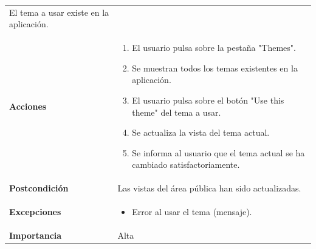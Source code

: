 \documentclass[
]{article}
\providecommand{\tightlist}{%
  \setlength{\itemsep}{0pt}\setlength{\parskip}{0pt}}
\begin{document}
\begin{longtable}[]{@{}ll@{}}
\begin{minipage}[t]{0.71\columnwidth}
El tema a usar existe en la aplicación.\strut
\end{minipage}\tabularnewline
\begin{minipage}[t]{0.23\columnwidth}\raggedright
\textbf{Acciones}\strut
\end{minipage} & \begin{minipage}[t]{0.71\columnwidth}\raggedright
\begin{enumerate}
\def\labelenumi{\arabic{enumi}.}
\tightlist
\item
  El usuario pulsa sobre la pestaña "Themes".
\item
  Se muestran todos los temas existentes en la aplicación.
\item
  El usuario pulsa sobre el botón "Use this theme" del tema a usar.
\item
  Se actualiza la vista del tema actual.
\item
  Se informa al usuario que el tema actual se ha cambiado
  satisfactoriamente.
\end{enumerate}\strut
\end{minipage}\tabularnewline
\begin{minipage}[t]{0.23\columnwidth}\raggedright
\textbf{Postcondición}\strut
\end{minipage} & \begin{minipage}[t]{0.71\columnwidth}\raggedright
Las vistas del área pública han sido actualizadas.\strut
\end{minipage}\tabularnewline
\begin{minipage}[t]{0.23\columnwidth}\raggedright
\textbf{Excepciones}\strut
\end{minipage} & \begin{minipage}[t]{0.71\columnwidth}\raggedright
\begin{itemize}
\tightlist
\item
  Error al usar el tema (mensaje).
\end{itemize}\strut
\end{minipage}\tabularnewline
\begin{minipage}[t]{0.23\columnwidth}\raggedright
\textbf{Importancia}\strut
\end{minipage} & \begin{minipage}[t]{0.71\columnwidth}\raggedright
Alta\strut
\end{minipage}\tabularnewline
\bottomrule
\end{longtable}
\end{document}
